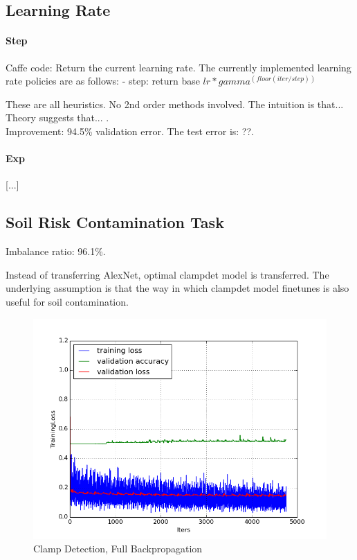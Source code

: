 \documentclass[a4paper,11pt]{article}
\begin{document}
\subsection{Learning Rate}

\paragraph{Step}

Caffe code:
 Return the current learning rate. The currently implemented learning rate
 policies are as follows:
    - step: return base $lr * gamma ^ (floor(iter / step))$
    

These are all heuristics. No 2nd order methods involved. The intuition is that... Theory suggests that... . \\

Improvement: 94.5\% validation error. The test error is: ??.\\

\paragraph{Exp}

[...] \\

\subsection{Soil Risk Contamination Task}

Imbalance ratio: 96.1\%.

Instead of transferring AlexNet, optimal clampdet model is transferred. The underlying assumption is that the way in which clampdet model finetunes is also useful for soil contamination. 

\begin{figure}[h!]
	\centering
	\includegraphics[scale=0.5]{images/plot_soil_contam_noneC.png}
	\caption{Clamp Detection, Full Backpropagation}
\end{figure}
\end{document}
